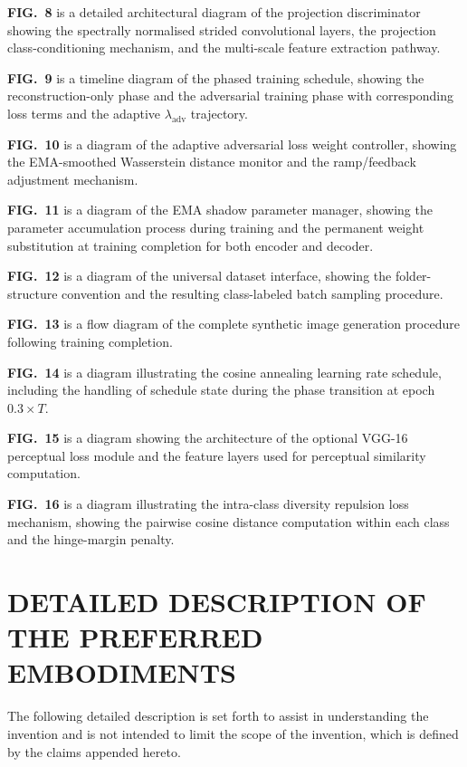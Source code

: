 \documentclass[12pt,letterpaper]{article}
\begin{document}
\textbf{FIG.~8} is a detailed architectural diagram of the projection
discriminator showing the spectrally normalised strided convolutional layers,
the projection class-conditioning mechanism, and the multi-scale feature
extraction pathway.

\textbf{FIG.~9} is a timeline diagram of the phased training schedule,
showing the reconstruction-only phase and the adversarial training phase with
corresponding loss terms and the adaptive $\lambda_{\text{adv}}$ trajectory.

\textbf{FIG.~10} is a diagram of the adaptive adversarial loss weight
controller, showing the EMA-smoothed Wasserstein distance monitor and the
ramp/feedback adjustment mechanism.

\textbf{FIG.~11} is a diagram of the EMA shadow parameter manager, showing
the parameter accumulation process during training and the permanent weight
substitution at training completion for both encoder and decoder.

\textbf{FIG.~12} is a diagram of the universal dataset interface, showing
the folder-structure convention and the resulting class-labeled batch
sampling procedure.

\textbf{FIG.~13} is a flow diagram of the complete synthetic image generation
procedure following training completion.

\textbf{FIG.~14} is a diagram illustrating the cosine annealing learning rate
schedule, including the handling of schedule state during the phase transition
at epoch $0.3 \times T$.

\textbf{FIG.~15} is a diagram showing the architecture of the optional VGG-16
perceptual loss module and the feature layers used for perceptual similarity
computation.

\textbf{FIG.~16} is a diagram illustrating the intra-class diversity
repulsion loss mechanism, showing the pairwise cosine distance computation
within each class and the hinge-margin penalty.

\section*{DETAILED DESCRIPTION OF THE PREFERRED EMBODIMENTS}

The following detailed description is set forth to assist in understanding
the invention and is not intended to limit the scope of the invention, which
is defined by the claims appended hereto.
\end{document}
